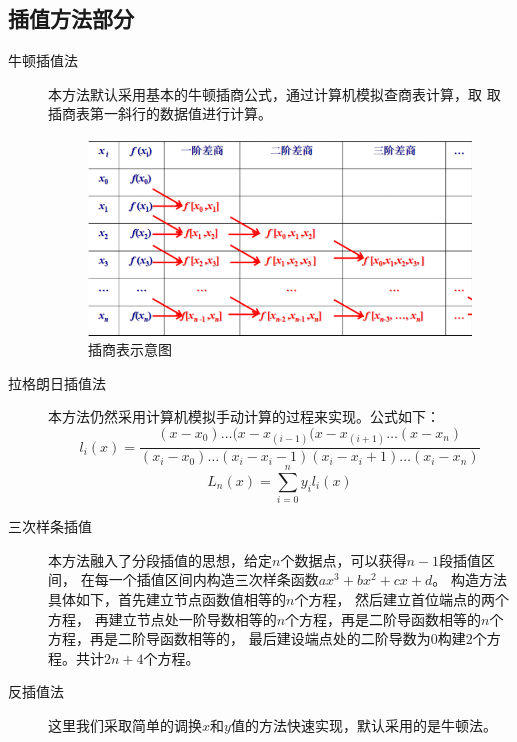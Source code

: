 \documentclass[UTF8]{ctexart}
\begin{document}
        \subsection{插值方法部分}
            \begin{description}
                \item [牛顿插值法] 本方法默认采用基本的牛顿插商公式，通过计算机模拟查商表计算，取
                取插商表第一斜行的数据值进行计算。
                    \begin{figure}[htb]
                        \centering
                        \includegraphics[scale = 0.6]{插商表.png}
                        \caption{插商表示意图}
                        \label{fig:newtontable}
                    \end{figure}
                \item [拉格朗日插值法] 本方法仍然采用计算机模拟手动计算的过程来实现。公式如下：
                    \begin{equation}
                        l_i(x) = \frac{(x-x_0)\dots(x-x_(i-1)(x-x_(i+1)\dots(x-x_n)}{(x_i-x_0)\dots(x_i-x_i-1)(x_i-x_i+1)\dots(x_i-x_n)}
                    \end{equation}
                    \begin{equation}
                        L_n(x) = \sum_{i=0}^n y_il_i(x)
                    \end{equation}
                \item [三次样条插值] 本方法融入了分段插值的思想，给定$n$个数据点，可以获得$n-1$段插值区间，
                在每一个插值区间内构造三次样条函数$ax^3+bx^2+cx+d$。
                构造方法具体如下，首先建立节点函数值相等的$n$个方程，
                然后建立首位端点的两个方程，
                再建立节点处一阶导数相等的$n$个方程，再是二阶导函数相等的$n$个方程，再是二阶导函数相等的，
                最后建设端点处的二阶导数为$0$构建$2$个方程。共计$2n+4$个方程。
                \item [反插值法] 这里我们采取简单的调换$x$和$y$值的方法快速实现，默认采用的是牛顿法。
            \end{description}
\end{document}
